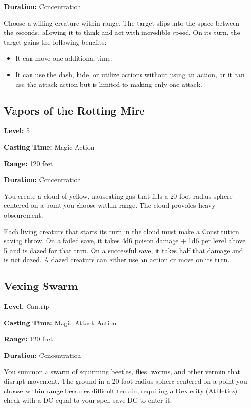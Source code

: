 \documentclass[12pt,letterpaper,twocolumn,openany,nodeprecatedcode,bg=none]{dndbook}
\providecommand{\tightlist}{%
  \setlength{\itemsep}{0pt}\setlength{\parskip}{0pt}}
\begin{document}
\textbf{Duration:} Concentration

Choose a willing creature within range. The target slips into the space
between the seconds, allowing it to think and act with incredible speed.
On its turn, the target gains the following benefits:

\begin{itemize}
\tightlist
\item
  It can move one additional time.
\item
  It can use the dash, hide, or utilize actions without using an action,
  or it can use the attack action but is limited to making only one
  attack.
\end{itemize}

\subsection{Vapors of the Rotting
Mire}\label{vapors-of-the-rotting-mire}

\textbf{Level:} 5

\textbf{Casting Time:} Magic Action

\textbf{Range:} 120 feet

\textbf{Duration:} Concentration

You create a cloud of yellow, nauseating gas that fills a 20-foot-radius
sphere centered on a point you choose within range. The cloud provides
heavy obscurement.

Each living creature that starts its turn in the cloud must make a
Constitution saving throw. On a failed save, it takes 4d6 poison damage
+ 1d6 per level above 5 and is dazed for that turn. On a successful
save, it takes half that damage and is not dazed. A dazed creature can
either use an action or move on its turn.

\subsection{Vexing Swarm}\label{vexing-swarm}

\textbf{Level:} Cantrip

\textbf{Casting Time:} Magic Attack Action

\textbf{Range:} 120 feet

\textbf{Duration:} Concentration

You summon a swarm of squirming beetles, flies, worms, and other vermin
that disrupt movement. The ground in a 20-foot-radius sphere centered on
a point you choose within range becomes difficult terrain, requiring a
Dexterity (Athletics) check with a DC equal to your spell save DC to
enter it.
\end{document}
